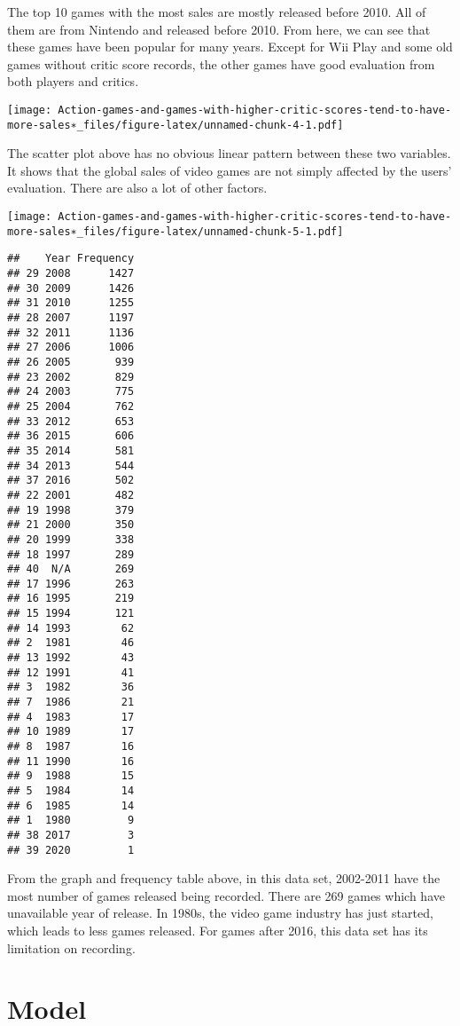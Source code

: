 \documentclass[
]{article}
\begin{document}
The top 10 games with the most sales are mostly released before 2010.
All of them are from Nintendo and released before 2010. From here, we
can see that these games have been popular for many years. Except for
Wii Play and some old games without critic score records, the other
games have good evaluation from both players and critics.

\texttt{[image: Action-games-and-games-with-higher-critic-scores-tend-to-have-more-sales∗\_files/figure-latex/unnamed-chunk-4-1.pdf]}

The scatter plot above has no obvious linear pattern between these two
variables. It shows that the global sales of video games are not simply
affected by the users' evaluation. There are also a lot of other
factors.

\texttt{[image: Action-games-and-games-with-higher-critic-scores-tend-to-have-more-sales∗\_files/figure-latex/unnamed-chunk-5-1.pdf]}

\begin{verbatim}
##    Year Frequency
## 29 2008      1427
## 30 2009      1426
## 31 2010      1255
## 28 2007      1197
## 32 2011      1136
## 27 2006      1006
## 26 2005       939
## 23 2002       829
## 24 2003       775
## 25 2004       762
## 33 2012       653
## 36 2015       606
## 35 2014       581
## 34 2013       544
## 37 2016       502
## 22 2001       482
## 19 1998       379
## 21 2000       350
## 20 1999       338
## 18 1997       289
## 40  N/A       269
## 17 1996       263
## 16 1995       219
## 15 1994       121
## 14 1993        62
## 2  1981        46
## 13 1992        43
## 12 1991        41
## 3  1982        36
## 7  1986        21
## 4  1983        17
## 10 1989        17
## 8  1987        16
## 11 1990        16
## 9  1988        15
## 5  1984        14
## 6  1985        14
## 1  1980         9
## 38 2017         3
## 39 2020         1
\end{verbatim}

From the graph and frequency table above, in this data set, 2002-2011
have the most number of games released being recorded. There are 269
games which have unavailable year of release. In 1980s, the video game
industry has just started, which leads to less games released. For games
after 2016, this data set has its limitation on recording.

\hypertarget{model}{%
\section{Model}\label{model}}
\end{document}
